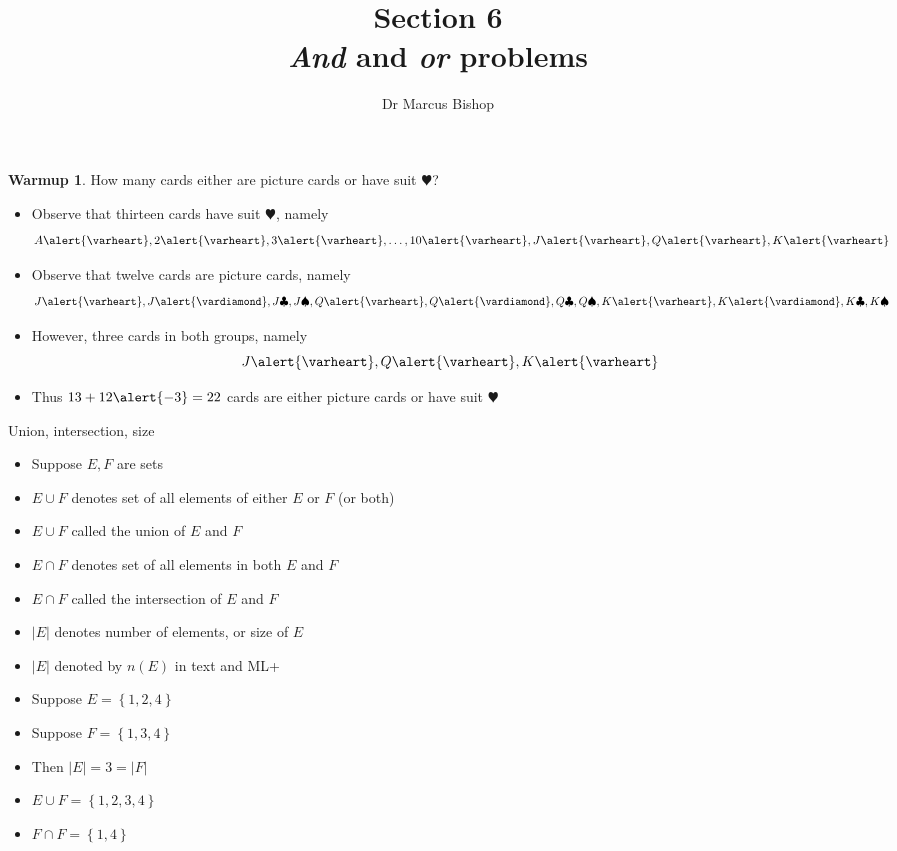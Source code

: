 \documentclass{beamer}
\title[\S6]{Section 6\\{\em And} and {\em or} problems}
\author{Dr Marcus Bishop}
\theoremstyle{definition}
\newtheorem{warmup}{Warmup}
\begin{document}
\begin{frame}\titlepage\end{frame}
\LogoOff

\begin{frame}
\begin{warmup}
How many cards \alert{either} are picture cards \alert{or} have
suit \alert{$\varheart$}?
\end{warmup}
\begin{itemize}
\item Observe that thirteen cards have
suit \alert{$\varheart$}, namely
\[A\alert{\varheart},
2\alert{\varheart},
3\alert{\varheart},\ldots,
10\alert{\varheart},
J\alert{\varheart},
Q\alert{\varheart},
K\alert{\varheart}\]
\item Observe that twelve cards are picture cards, namely
\[J\alert{\varheart},J\alert{\vardiamond},J\clubsuit,J\spadesuit,
Q\alert{\varheart},Q\alert{\vardiamond},Q\clubsuit,Q\spadesuit,
K\alert{\varheart},K\alert{\vardiamond},K\clubsuit,K\spadesuit\]
\item However, \alert{three} cards in both groups,
namely
\[J\alert{\varheart},Q\alert{\varheart},K\alert{\varheart}\]
\item Thus $13+12\alert{-3}=22$ cards are either picture cards or have 
suit \alert{$\varheart$}
\end{itemize}
\end{frame}

\begin{frame}{Union, intersection, size}
\begin{itemize}
\item Suppose $E,F$ are sets
\item \alert{$E\cup F$} denotes set of all elements of \alert{either}
$E$ \alert{or} $F$ (or \alert{both})
\item $E\cup F$ called the \alert{union} of $E$ and $F$
\item \alert{$E\cap F$} denotes set of all elements in \alert{both}
$E$ \alert{and} $F$
\item $E\cap F$ called the \alert{intersection} of $E$ and $F$
\item \alert{$\left|E\right|$} denotes number of elements,
or \alert{size} of $E$
\item $\left|E\right|$ denoted by \alert{$n\left(E\right)$}
in text and ML+
\end{itemize}
\begin{example}
\begin{itemize}
\item Suppose $E=\left\{1,2,4\right\}$
\item Suppose $F=\left\{1,3,4\right\}$
\item Then $\left|E\right|=3=\left|F\right|$
\item $E\cup F=\left\{1,2,3,4\right\}$
\item $F\cap F=\left\{1,4\right\}$
\end{itemize}
\end{example}
\end{frame}
\end{document}
